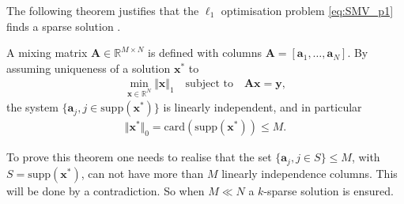 The following theorem justifies that the $\ell_1$ optimisation problem \eqref{eq:SMV_p1} finds a sparse solution \cite[p. 62-63]{FR}.
\begin{theorem}
A mixing matrix $\mathbf{A} \in \mathbb{R}^{M \times N}$ is defined with columns $\mathbf{A} = [\mathbf{a}_1, \dots, \mathbf{a}_N]$. 
By assuming uniqueness of a solution $\mathbf{x}^{\ast}$ to
\begin{align*}
\min_{\mathbf{x} \in \mathbb{R}^N} \Vert \mathbf{x} \Vert_1 \quad \text{subject to} \quad \mathbf{Ax} = \mathbf{y},
\end{align*}
the system $\lbrace \mathbf{a}_j, j \in \text{supp}( \mathbf{x}^\ast) \rbrace$ is linearly independent, and in particular
\begin{align*}
\Vert \mathbf{x}^\ast \Vert_0 = \text{card}(\text{supp} (\mathbf{x}^\ast)) \leq M.
\end{align*}
\end{theorem}
To prove this theorem one needs to realise that the set $\lbrace \mathbf{a}_j, j \in S \rbrace \leq M$, with $S = \text{supp}(\mathbf{x}^\ast)$, can not have more than $M$ linearly independence columns. This will be done by a contradiction.
So when $M \ll N$ a $k$-sparse solution is ensured.
